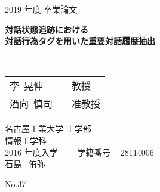 \thisfancypage{}{}
\thispagestyle{empty}

\vspace*{2cm}
\begin{center}
{\Large 2019 年度 \quad 卒業論文}

\vspace{2.5cm}

{\fontsize{22.5pt}{5pt} \bfseries \mbox{対話状態追跡における}\\} \vspace{0.3cm}
{\fontsize{22.5pt}{5pt} \bfseries \mbox{対話行為タグを用いた重要対話履歴抽出}\\}
\end{center}

\vspace{3.0cm}
\Large
\begin{center}
  \hspace{-4.5cm}{\Large 指導教員}\\
\vspace{0.3cm}
\begin{tabular}{ll}
  {\LARGE 李~晃伸}&{\Large~~教授}\\
  {\LARGE 酒向~慎司}&{\Large~~准教授}\\
\end{tabular}
\end{center}

\vspace{2.0cm}
\begin{center}
名古屋工業大学 工学部\\
情報工学科 \\
{\large 2016 年度入学 ~~~~学籍番号} ~ 28114006 \\
\vspace{1cm}
{\LARGE 石島 \ 侑弥 }\\
\end{center}

\begin{flushright}
  {\LARGE No.37}
\end{flushright}

\normalsize
\newpage

\thisfancypage{}{}
\thispagestyle{empty}

\thisfancypage{}{}
\thispagestyle{empty}

